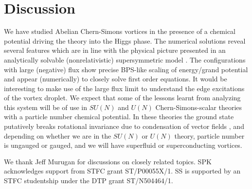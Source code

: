 \documentclass[12pt,a4paper]{article}
\begin{document}
\section{Discussion}
We have studied Abelian Chern-Simons vortices in the presence of a chemical potential driving the theory into the Higgs phase. The numerical solutions reveal several features which are in line with the physical picture presented in an analytically solvable (nonrelativistic) supersymmetric model \cite{Tong:2015xaa, Tong:2003vy}.  The configurations with large (negative) flux show precise BPS-like scaling of energy/grand potential and appear (numerically) to closely solve first order equations.
It would be interesting to make use of the large flux limit to understand the edge excitations of the vortex droplet. We expect that some of the lessons learnt from analyzing this system will be of use in $SU(N)$ and $U(N)$ Chern-Simons-scalar theories with a particle number chemical potential. In these theories the ground state putatively breaks rotational invariance due to condensation of vector fields \cite{Kumar:2018nkf}, and depending on whether we are in the $SU(N)$ or $U(N)$ theory, particle number is ungauged or gauged,  and we will have superfluid or superconducting vortices. 

\acknowledgments We thank Jeff Murugan for discussions on closely related topics. SPK acknowledges support from STFC grant ST/P00055X/1. SS is supported by an STFC studentship under the DTP grant ST/N504464/1.
\end{document}
